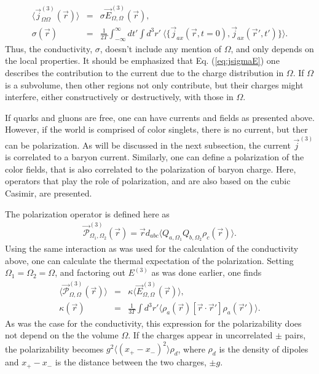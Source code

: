 \documentclass[aps, prc, 12pt, nofootinbib, showpacs, superscriptaddress, tightenlines, groupedaddress]{revtex4-2}
\begin{document}
\begin{eqnarray}\label{eq:kubo}
\langle\vec{j}^{(3)}_{\Omega\Omega}(\vec{r})\rangle&=&\sigma \vec{E}^{(3)}_{\Omega,\Omega}(\vec{r}),\\
\nonumber
\sigma(\vec{r})&=&\frac{1}{2T}\int_{-\infty}^\infty dt'\int d^3r'~\langle\{\vec{j}_{ax}(\vec{r},t=0),\vec{j}_{ax}(\vec{r}',t')\}\rangle.
\end{eqnarray}
Thus, the conductivity, $\sigma$, doesn't include any mention of $\Omega$, and only depends on the local properties. It should be emphasized that Eq. (\ref{eq:jsigmaE}) one describes the contribution to the current due to the charge distribution in $\Omega$. If $\Omega$ is a subvolume, then other regions not only contribute, but their charges might interfere, either constructively or destructively, with those in $\Omega$.

If quarks and gluons are free, one can have currents and fields as presented above. However, if the world is comprised of color singlets, there is no current, but ther can be polarization. As will be discussed in the next subsection, the current $\vec{j}^{(3)}$ is correlated to a baryon current. Similarly, one can define a polarization of the color fields, that is also correlated to the polarization of baryon charge. Here, operators that play the role of polarization, and are also based on the cubic Casimir, are presented. 

The polarization operator is defined here as
\begin{eqnarray}
\vec{\mathcal{P}}_{\Omega_1,\Omega_2}^{(3)}(\vec{r})=\vec{r}d_{abc}\langle Q_{a,\Omega_1}Q_{b,\Omega_2}\rho_c(\vec{r})\rangle.
\end{eqnarray}
Using the same interaction as was used for the calculation of the conductivity above, one can calculate the thermal expectation of the polarization. Setting $\Omega_1=\Omega_2=\Omega$, and factoring out $E^{(3)}$ as was done earlier, one finds
\begin{eqnarray}\label{eq:polarization}
\langle\vec{\mathcal{P}}_{\Omega,\Omega}^{(3)}(\vec{r})\rangle&=&\kappa \langle\vec{E}^{(3)}_{\Omega,\Omega}(\vec{r})\rangle,\\
\nonumber
\kappa(\vec{r})&=&\frac{1}{3T}\int d^3r'\langle \rho_a(\vec{r})[\vec{r}\cdot\vec{r}']\rho_a(\vec{r}')\rangle.
\end{eqnarray}
As was the case for the conductivity, this expression for the polarizability does not depend on the the volume $\Omega$. If the charges appear in uncorrelated $\pm$ pairs, the polarizability becomes $g^2\langle(x_+-x_-)^2\rangle\rho_d$, where $\rho_d$ is the density of dipoles and $x_+-x_-$ is the distance between the two charges, $\pm g$. 
\end{document}
